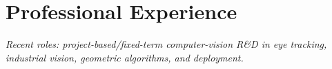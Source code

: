 \documentclass[letterpaper]{DS_class_file} %
\begin{document}
\makeprofile %




\section{Professional Experience}

{\small\itshape Recent roles: project-based/fixed-term computer-vision R\&D in eye tracking, industrial vision, geometric algorithms, and deployment.}
\end{document}
